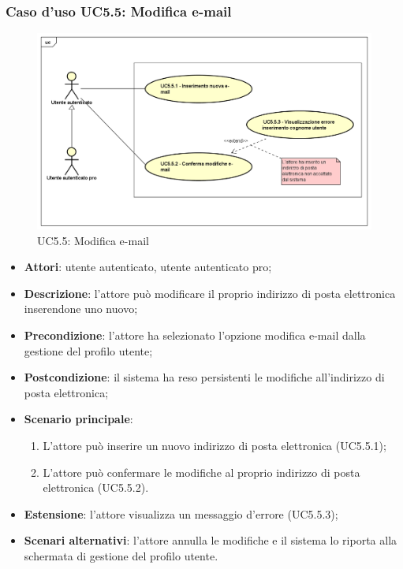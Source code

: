 \subsubsection{Caso d'uso UC5.5: Modifica e-mail}
\label{UC5.5}
\begin{figure}[h]
	\centering
	\includegraphics[scale=0.5,keepaspectratio]{UML/UC5_5.png}
	\caption{UC5.5: Modifica e-mail}
\end{figure}

\begin{itemize}
	\item \textbf{Attori}: utente autenticato, utente autenticato pro;
	\item \textbf{Descrizione}: l'attore può modificare il proprio indirizzo di posta elettronica inserendone uno nuovo;
	\item \textbf{Precondizione}:  l'attore ha selezionato l'opzione modifica e-mail dalla gestione del profilo utente; 
	\item \textbf{Postcondizione}: il sistema ha reso persistenti le modifiche all'indirizzo di posta elettronica;
	\item \textbf{Scenario principale}:
		\begin{enumerate}
			\item L'attore può inserire un nuovo indirizzo di posta elettronica (UC5.5.1);
			\item L'attore può confermare le modifiche al proprio indirizzo di posta elettronica (UC5.5.2).
		\end{enumerate}
		\item \textbf{Estensione}: l'attore visualizza un messaggio d'errore (UC5.5.3);
	\item \textbf{Scenari alternativi}: l'attore annulla le modifiche e il sistema lo riporta alla schermata di gestione del profilo utente.
\end{itemize}


